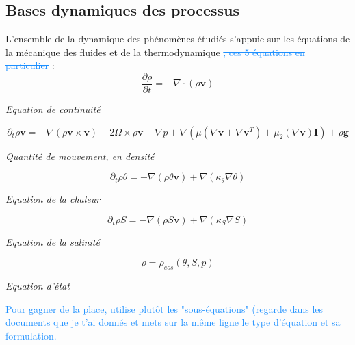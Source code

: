 \documentclass{rapportECC}
\newcommand{\FAadd}[1]{\textcolor{DodgerBlue}{{#1}}}                     %
\newcommand{\FAdel}[1]{\textcolor{DodgerBlue}{\sout{#1}}}                %
\begin{document}
\subsection{Bases dynamiques des processus}
\label{Dynamiques globales}
L'ensemble de la dynamique des phénomènes étudiés s'appuie sur les équations de la mécanique des fluides et de la thermodynamique \FAdel{, ces 5 équations en particulier} :
\begin{equation}
    \frac{\partial \rho}{\partial t} = - \nabla \cdot (\rho \mathbf{v})
    \label{eq:continuite}
\end{equation}
\begin{center}
    \textit{Equation de continuité}
\end{center}
\begin{equation}
    \partial_t \rho \mathbf{v} = - \nabla (\rho \mathbf{v} \times \mathbf{v}) - 2\Omega \times \rho \mathbf{v} - \nabla p + \nabla (\mu (\nabla\mathbf{v} + \nabla\mathbf{v}^T) + \mu_2(\nabla \mathbf{v}) \mathbf{I}) +\rho \mathbf{g}
    \label{eq: qtt de mouvement}
\end{equation}
\begin{center}
    \textit{Quantité de mouvement, en densité}
\end{center}


\begin{equation}
    \partial_t \rho \theta = -\nabla(\rho\theta\mathbf{v}) + \nabla(\kappa_{\theta}\nabla\theta)
    \label{eq:chaleur}
\end{equation}
\begin{center}
    \textit{Equation de la chaleur}
\end{center}

\begin{equation}
    \partial_t \rho S = -\nabla(\rho S\mathbf{v}) + \nabla(\kappa_S\nabla S)
    \label{eq:salinite}
\end{equation}
\begin{center}
    \textit{Equation de la salinité} 
\end{center}
\begin{equation}
    \rho = \rho_{eos}(\theta , S, p)
    \label{eq:etat}
\end{equation}
\begin{center}
    \textit{Equation d'état}
\end{center}
\FAadd{Pour gagner de la place, utilise plutôt les "sous-équations" (regarde dans les documents que je t'ai donnés et mets sur la même ligne le type d'équation et sa formulation.}
\end{document}
